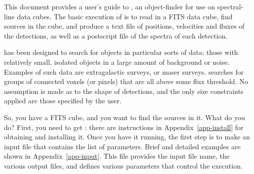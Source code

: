 %
%
%
%


This document provides a user's guide to \duchamp, an object-finder
for use on spectral-line data cubes. The basic execution of \duchamp
is to read in a FITS data cube, find sources in the cube, and produce
a text file of positions, velocities and fluxes of the detections, as
well as a postscript file of the spectra of each detection.

\duchamp has been designed to search for objects in particular sorts
of data: those with relatively small, isolated objects in a large
amount of background or noise. Examples of such data are extragalactic
\hi surveys, or maser surveys. \duchamp searches for groups of
connected voxels (or pixels) that are all above some flux
threshold. No assumption is made as to the shape of detections, and
the only size constraints applied are those specified by the user.


So, you have a FITS cube, and you want to find the sources in it. What
do you do? First, you need to get \duchamp: there are instructions in
Appendix~\ref{app-install} for obtaining and installing it. Once you
have it running, the first step is to make an input file that contains
the list of parameters. Brief and detailed examples are shown in
Appendix~\ref{app-input}. This file provides the input file name, the
various output files, and defines various parameters that control the
execution.

